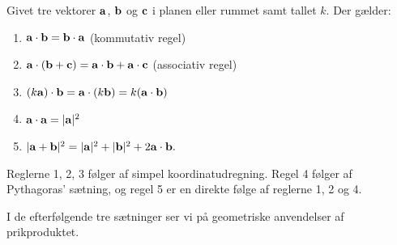 \begin{theorem}\label{prikregneregler}
Givet tre vektorer $\mathbf{a}$, $\mathbf{b}$ og $\mathbf{c}$ i planen eller rummet samt tallet $k$. Der gælder:
\begin{enumerate}
\item
$\mathbf{a} \cdot \mathbf{b} = \mathbf{b} \cdot \mathbf{a}$ (kommutativ regel)
\item
$\mathbf{a} \cdot (\mathbf{b}+\mathbf{c})=\mathbf{a} \cdot \mathbf{b} + \mathbf{a} \cdot \mathbf{c}$ (associativ regel)
\item
$(k\mathbf{a}) \cdot \mathbf{b}=\mathbf{a} \cdot (k\mathbf{b})=k(\mathbf{a} \cdot \mathbf{b})$
\item
$\mathbf{a} \cdot \mathbf{a} = |\mathbf{a}|^2$ 
\item
$|\mathbf{a}+\mathbf{b}|^2=|\mathbf{a}|^2+|\mathbf{b}|^2+2\mathbf{a} \cdot \mathbf{b}.$
\end{enumerate}
\end{theorem}

\begin{bevis}
Reglerne 1, 2, 3 følger af simpel koordinatudregning. Regel 4 følger af Pythagoras' sætning, og regel 5 er en direkte følge af reglerne 1, 2 og 4.
\end{bevis}
I de efterfølgende tre sætninger ser vi på geometriske anvendelser af prikproduktet.

